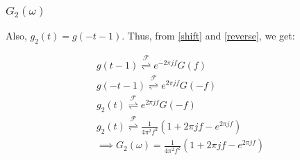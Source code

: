 \documentclass{beamer}
\providecommand{\fourier}{\overset{\mathcal{F}}{ \rightleftharpoons}}
\begin{document}
\begin{frame}
\begin{columns}
\begin{column}{0.5\textwidth}
\begin{figure}
\begin{flushleft}
\end{flushleft}
\end{figure}
\end{column}
\end{columns}
\end{frame}


\begin{frame}
    \frametitle{$G_2(\omega)$}
    \begin{flushleft}
    Also, $g_2(t) = g(-t-1)$. Thus, from \eqref{shift} and \eqref{reverse}, we get:

\begin{align}
   g(t-1) \fourier e^{-2\pi jf}G(f)\\
    g(-t-1) \fourier e^{2\pi jf} G(-f)\\
    g_2(t) \fourier e^{2\pi jf}G(-f) \\
   g_2(t) \fourier \frac{1}{4\pi^2f^2}(1 + 2\pi jf  - e^{2\pi jf})\\
   \implies G_2(\omega) =  \frac{1}{4\pi^2f^2}(1 + 2\pi jf  - e^{2\pi jf})
\end{align}
  \end{flushleft}
\end{frame}
\end{document}
